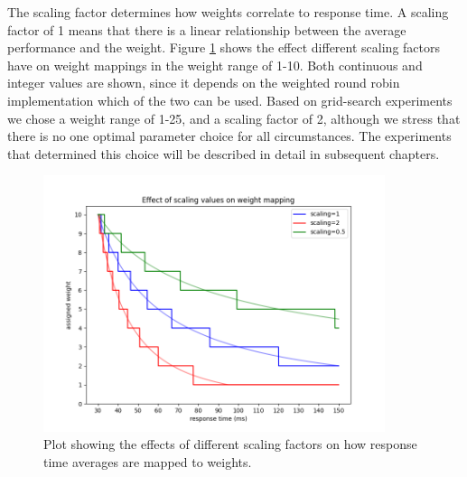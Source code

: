 \documentclass[draft,final]{vutinfth} %
\begin{document}


The scaling factor determines how weights correlate to response time. A scaling factor of 1 means that there is a linear relationship between the average performance and the weight.
Figure \ref{fig:weight_mapping_example} shows the effect different scaling factors have on weight mappings in the weight range of 1-10. Both continuous and integer values are shown, since it depends on the weighted round robin implementation which of the two can be used.
Based on grid-search experiments we chose a weight range of 1-25, and a scaling factor of 2, although we stress that there is no one optimal parameter choice for all circumstances.
The experiments that determined this choice will be described in detail in subsequent chapters.


\begin{figure}
    \centering
    \includegraphics[width=10cm]{graphics/graphs/weight_mapping_scaling_example.png}
    \caption{Plot showing the effects of different scaling factors on how response time averages are mapped to weights.}
    \label{fig:weight_mapping_example}
\end{figure}
\end{document}
